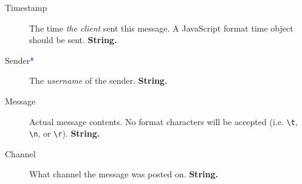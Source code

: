 \documentclass[12pt]{scrartcl}
\newcommand{\reqalt}{\textcolor{blue}{*}}
\begin{document}
\begin{description}
    \item[Timestamp] The time \textit{the client} sent this message. A JavaScript format time object should be sent. \textbf{String.}
    \item[Sender\reqalt] The \textit{username} of the sender. \textbf{String.}
    \item[Message] Actual message contents. No format characters will be accepted (i.e. \texttt{\textbackslash t}, \texttt{\textbackslash n}, or \texttt{\textbackslash r}). \textbf{String.}
    \item[Channel] What channel the message was posted on. \textbf{String.}
\end{description}
\end{document}

